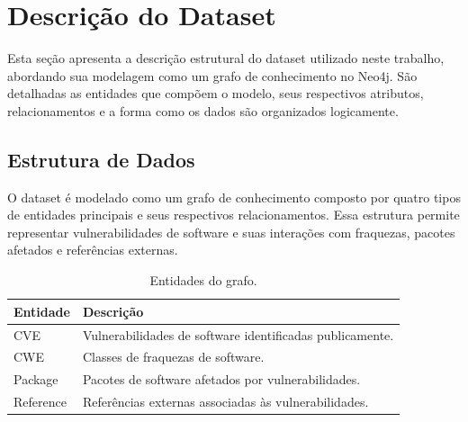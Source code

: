 \section{Descrição do Dataset}

Esta seção apresenta a descrição estrutural do dataset utilizado neste trabalho, abordando sua modelagem como um grafo de conhecimento no Neo4j. São detalhadas as entidades que compõem o modelo, seus respectivos atributos, relacionamentos e a forma como os dados são organizados logicamente.

\subsection{Estrutura de Dados}
O dataset é modelado como um grafo de conhecimento composto por quatro tipos de entidades principais e seus respectivos relacionamentos. Essa estrutura permite representar vulnerabilidades de software e suas interações com fraquezas, pacotes afetados e referências externas.

\begin{table}[ht]
    \centering
    \caption{Entidades do grafo.}
    \label{tab:entities}
    \small
    \begin{tabular}{|p{2.5cm}|p{10cm}|}
        \hline
        \textbf{Entidade} & \textbf{Descrição}                                       \\
        \hline
        CVE               & Vulnerabilidades de software identificadas publicamente. \\
        \hline
        CWE               & Classes de fraquezas de software.                        \\
        \hline
        Package           & Pacotes de software afetados por vulnerabilidades.       \\
        \hline
        Reference         & Referências externas associadas às vulnerabilidades.     \\
        \hline
    \end{tabular}
\end{table}

